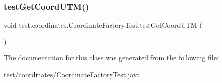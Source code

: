 \subsubsection{\texorpdfstring{test\+Get\+Coord\+U\+T\+M()}{testGetCoordUTM()}}
{\footnotesize\ttfamily void test.\+coordinates.\+Coordinate\+Factory\+Test.\+test\+Get\+Coord\+U\+TM (\begin{DoxyParamCaption}{ }\end{DoxyParamCaption})}



The documentation for this class was generated from the following file\+:\begin{DoxyCompactItemize}
\item 
test/coordinates/\hyperlink{_coordinate_factory_test_8java}{Coordinate\+Factory\+Test.\+java}\end{DoxyCompactItemize}

